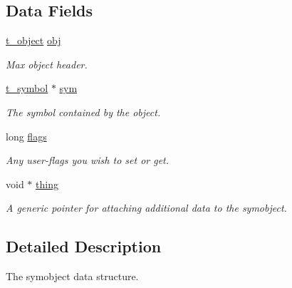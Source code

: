 \subsection*{Data Fields}
\begin{DoxyCompactItemize}
\item 
\hypertarget{structt__symobject_a73fa127160cd11d7111eb0b75f15a649}{
\hyperlink{structt__object}{t\_\-object} \hyperlink{structt__symobject_a73fa127160cd11d7111eb0b75f15a649}{obj}}
\label{structt__symobject_a73fa127160cd11d7111eb0b75f15a649}

\begin{DoxyCompactList}\small\item\em Max object header. \item\end{DoxyCompactList}\item 
\hypertarget{structt__symobject_aebafd62d2b8ac1273c32e17b767b999b}{
\hyperlink{structt__symbol}{t\_\-symbol} $\ast$ \hyperlink{structt__symobject_aebafd62d2b8ac1273c32e17b767b999b}{sym}}
\label{structt__symobject_aebafd62d2b8ac1273c32e17b767b999b}

\begin{DoxyCompactList}\small\item\em The symbol contained by the object. \item\end{DoxyCompactList}\item 
\hypertarget{structt__symobject_a6e4b87b05762ec56b8b78c269211f3b8}{
long \hyperlink{structt__symobject_a6e4b87b05762ec56b8b78c269211f3b8}{flags}}
\label{structt__symobject_a6e4b87b05762ec56b8b78c269211f3b8}

\begin{DoxyCompactList}\small\item\em Any user-\/flags you wish to set or get. \item\end{DoxyCompactList}\item 
\hypertarget{structt__symobject_a5c2e6a714af33eee38dac5a9261dfa23}{
void $\ast$ \hyperlink{structt__symobject_a5c2e6a714af33eee38dac5a9261dfa23}{thing}}
\label{structt__symobject_a5c2e6a714af33eee38dac5a9261dfa23}

\begin{DoxyCompactList}\small\item\em A generic pointer for attaching additional data to the symobject. \item\end{DoxyCompactList}\end{DoxyCompactItemize}


\subsection{Detailed Description}
The symobject data structure. 